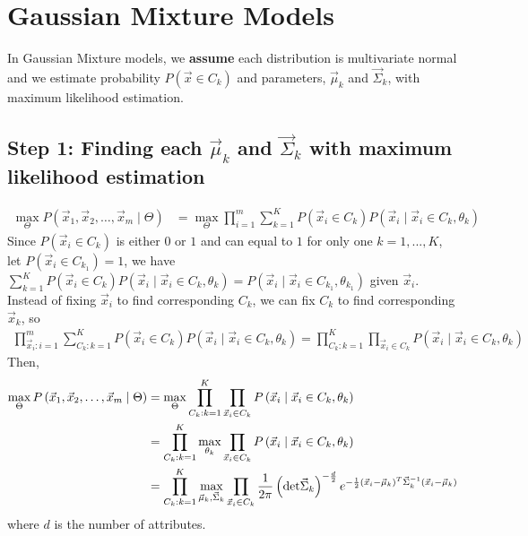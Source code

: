 \documentclass[11pt]{elegantbook}
\begin{document}
\section{Gaussian Mixture Models}
In Gaussian Mixture models, we \textbf{assume} each distribution is multivariate normal and we estimate probability $P(\vec{x}\in C_k)$ and parameters, $\vec{\mu}_k$ and $\vec{\Sigma}_k$, with maximum likelihood estimation. 

\subsection{Step 1: Finding each $\vec{\mu}_k$ and $\vec{\Sigma}_k$ with maximum likelihood estimation}
\begin{equation}
    \begin{aligned}
        \max_{\Theta}P\left(\vec{x}_1, \vec{x}_2, \ldots, \vec{x}_m \mid \Theta\right)&=\max_{\Theta}\prod_{i=1}^m \sum_{k=1}^K P\left(\vec{x}_i \in C_k\right) P\left(\vec{x}_i \mid \vec{x}_i \in C_k, \theta_k\right)
    \end{aligned}
    \nonumber
\end{equation}
Since $P(\vec{x}_i\in C_k)$ is either $0$ or $1$ and can equal to $1$ for only one $k=1,...,K$, let $P(\vec{x}_i\in C_{k_1})=1$, we have $\sum_{k=1}^K P\left(\vec{x}_i \in C_k\right) P\left(\vec{x}_i \mid \vec{x}_i \in C_k, \theta_k\right)=P\left(\vec{x}_i \mid \vec{x}_i \in C_{k_1}, \theta_{k_1}\right)$ given $\vec{x}_i$. Instead of fixing $\vec{x}_i$ to find corresponding $C_k$, we can fix $C_k$ to find corresponding $\vec{x}_k$, so
\begin{equation}
    \begin{aligned}
        \prod_{\vec{x}_i:i=1}^m\sum_{C_k:k=1}^K P\left(\vec{x}_i \in C_k\right) P\left(\vec{x}_i \mid \vec{x}_i \in C_k, \theta_k\right)=\prod_{C_k:k=1}^K \prod_{\vec{x}_i\in C_k}P\left(\vec{x}_i \mid \vec{x}_i \in C_k, \theta_k\right)
    \end{aligned}
    \nonumber
\end{equation}
Then,
\begin{equation}
    \begin{aligned}
        \max_{\Theta}P\left(\vec{x}_1, \vec{x}_2, \ldots, \vec{x}_m \mid \Theta\right)&=\max_{\Theta}\prod_{C_k:k=1}^K \prod_{\vec{x}_i\in C_k}P\left(\vec{x}_i \mid \vec{x}_i \in C_k, \theta_k\right)\\
        &=\prod_{C_k:k=1}^K\max_{\theta_k} \prod_{\vec{x}_i\in C_k}P\left(\vec{x}_i \mid \vec{x}_i \in C_k, \theta_k\right)\\
        &=\prod_{C_k:k=1}^K\max_{\vec{\mu}_k,\vec{\Sigma}_k}\prod_{\vec{x}_i\in C_k}\frac{1}{2\pi}\left(\textnormal{det}\vec{\Sigma}_k\right)^{-\frac{d}{2}}e^{-\frac{1}{2}(\vec{x}_i-\vec{\mu}_k)^T \vec{\Sigma}_k^{-1}(\vec{x}_i-\vec{\mu}_k)}
    \end{aligned}
    \nonumber
\end{equation}
where $d$ is the number of attributes.
\end{document}
